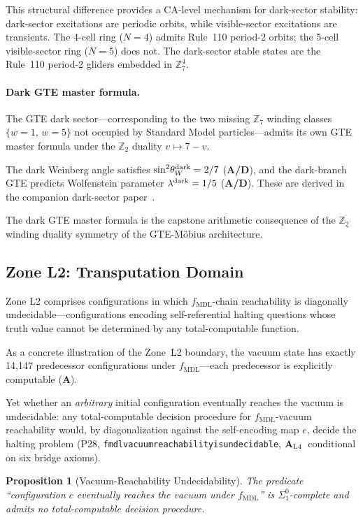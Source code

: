 \documentclass[12pt,letterpaper]{article}
\newtheorem{proposition}[theorem]{Proposition}
\newcommand{\fmdl}{f_{\mathrm{MDL}}}
\newcommand{\Zseven}{\mathbb{Z}_7}
\newcommand{\catAL}{\ensuremath{\textbf{A}_{\rm L4}}}
\newcommand{\catA}{\textbf{A}}
\newcommand{\catAD}{\textbf{A/D}}
\newcommand{\lean}[1]{%
  \penalty-100
  \begingroup\def\_{\textunderscore\allowbreak}\texttt{#1}\endgroup}
\begin{document}
This structural difference provides a CA-level mechanism for dark-sector stability:
dark-sector excitations are periodic orbits, while visible-sector excitations are
transients.  The 4-cell ring ($N = 4$) admits Rule~110 period-2 orbits; the 5-cell
visible-sector ring ($N = 5$) does not.  The dark-sector stable states are the
Rule~110 period-2 gliders embedded in $\Zseven^4$.

\paragraph{Dark GTE master formula.}
The GTE dark sector---corresponding to the two missing $\Zseven$ winding classes
$\{w = 1,\, w = 5\}$ not occupied by Standard Model particles---admits its own GTE
master formula under the $\mathbb{Z}_2$ duality $v \mapsto 7 - v$.

The dark Weinberg angle satisfies $\sin^2\!\theta_W^{\rm dark} = 2/7$ (\catAD), and
the dark-branch GTE predicts Wolfenstein parameter $\lambda^{\rm dark} = 1/5$
(\catAD).  These are derived in the companion dark-sector
paper~\cite{SpivackMirrorBraidAtlas}.

The dark GTE master formula is the capstone arithmetic consequence of the
$\mathbb{Z}_2$ winding duality symmetry of the GTE-M\"{o}bius architecture.

\subsection{Zone L2: Transputation Domain}
\label{sec:zone2}

Zone L2 comprises configurations in which $\fmdl$-chain reachability is
diagonally undecidable---configurations encoding self-referential halting
questions whose truth value cannot be determined by any total-computable function.

As a concrete illustration of the Zone~L2 boundary, the vacuum state has exactly
14,147 predecessor configurations under $\fmdl$---each predecessor is explicitly
computable (\catA).

Yet whether an \emph{arbitrary} initial configuration eventually reaches the vacuum is
undecidable: any total-computable decision procedure for $\fmdl$-vacuum reachability
would, by diagonalization against the self-encoding map $e$, decide the halting problem
(P28, \lean{fmdl\_vacuum\_reachability\_is\_undecidable}, \catAL\ conditional on six
bridge axioms).

\begin{proposition}[Vacuum-Reachability Undecidability]
\label{thm:incomplete}
The predicate ``configuration $c$ eventually reaches the vacuum under $\fmdl$'' is
$\Sigma^0_1$-complete and admits no total-computable decision procedure.
\end{proposition}
\end{document}
